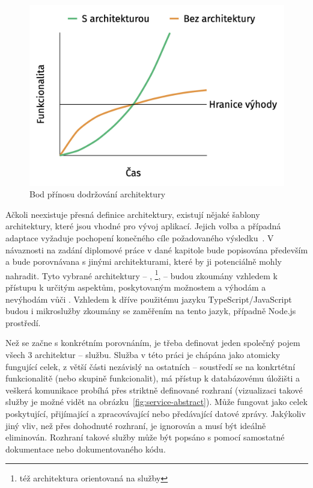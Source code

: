 \begin{figure}[htbp]
   \centering
   \includegraphics[max width=\textwidth]{assets/draft-architecture-line}
   \caption[Bod přínosu dodržování architektury]{Bod přínosu dodržování architektury~\cite{archoworthit}}\label{fig:architecture-line}
\end{figure}


Ačkoli neexistuje přesná definice architektury, existují nějaké šablony architektury, které jsou vhodné pro vývoj aplikací.
Jejich volba a případná adaptace vyžaduje pochopení konečného cíle požadovaného výsledku~\cite{softarch}.
V návaznosti na zadání diplomové práce v dané kapitole bude popisována především  a bude porovnávana s jinými architekturami, které by ji potenciálně mohly nahradit.
Tyto vybrané architektury – , \footnote{též architektura orientovaná na služby},  – budou zkoumány vzhledem k přístupu k určitým aspektům, poskytovaným možnostem a výhodám a nevýhodám vůči .
Vzhledem k dříve použitému jazyku TypeScript/JavaScript budou i mikroslužby zkoumány se zaměřením na tento jazyk, případně Node.js prostředí.


Než se začne s konkrétním porovnáním, je třeba definovat jeden společný pojem všech 3 architektur – službu.
Služba v této práci je chápána jako atomicky fungující celek, z větší části nezávislý na ostatních – soustředí se na konkrtétní funkcionalitě (nebo skupině funkcionalit), má přístup k databázovému úložišti a veškerá komunikace probíhá přes striktně definované rozhraní (vizualizaci takové služby je možné vidět na obrázku~\ref{fig:service-abstract}).
Může fungovat jako celek poskytující, přijímající a zpracovávající nebo předávající datové zprávy.
Jakýkoliv jiný vliv, než přes dohodnuté rozhraní, je ignorován a musí být ideálně eliminován.
Rozhraní takové služby může být popsáno s pomocí samostatné dokumentace nebo dokumentovaného kódu.


